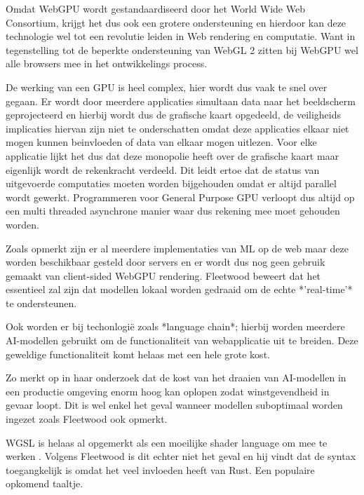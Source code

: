Omdat WebGPU wordt gestandaardiseerd door het World Wide Web Consortium, krijgt het dus ook een grotere ondersteuning en hierdoor kan deze technologie wel tot een revolutie leiden in Web rendering en computatie. Want in tegenstelling tot de beperkte ondersteuning van WebGL 2 zitten bij WebGPU wel alle browsers mee in het ontwikkelings process. \autocite{Surma2022}

\bigbreak{}

De werking van een GPU is heel complex, hier wordt dus vaak te snel over gegaan. Er wordt door meerdere applicaties simultaan data naar het beeldscherm geprojecteerd en hierbij wordt dus de grafische kaart opgedeeld, de veiligheids implicaties hiervan zijn niet te onderschatten omdat deze applicaties elkaar niet mogen kunnen beinvloeden of data van elkaar mogen uitlezen. Voor elke applicatie lijkt het dus dat deze monopolie heeft over de grafische kaart maar eigenlijk wordt de rekenkracht verdeeld. Dit leidt ertoe dat de status van uitgevoerde computaties moeten worden bijgehouden omdat er altijd parallel wordt gewerkt. Programmeren voor General Purpose GPU verloopt dus altijd op een multi threaded asynchrone manier waar dus rekening mee moet gehouden worden. \autocite{Surma2022}

Zoals \textcite{Fleetwood2023a} opmerkt zijn er al meerdere implementaties van ML op de web maar deze worden beschikbaar gesteld door servers en er wordt dus nog geen gebruik gemaakt van client-sided WebGPU rendering. Fleetwood beweert dat het essentieel zal zijn dat modellen lokaal worden gedraaid om de echte *'real-time'* te ondersteunen.

\bigbreak{}

Ook worden er bij techonlogië zoals *language chain*; hierbij worden meerdere AI-modellen gebruikt om de functionaliteit van webapplicatie uit te breiden. Deze geweldige functionaliteit komt helaas met een hele grote kost.

\bigbreak{}

Zo merkt \textcite{Huyen2023} op in haar onderzoek dat de kost van het draaien van AI-modellen in een productie omgeving enorm hoog kan oplopen zodat winstgevendheid in gevaar loopt. Dit is wel enkel het geval wanneer modellen suboptimaal worden ingezet zoals Fleetwood ook opmerkt.

\bigbreak{}

WGSL is helaas al opgemerkt als een moeilijke shader language om mee te werken \textcite{Madrigal2023}. Volgens Fleetwood is dit echter niet het geval en hij vindt dat de syntax toegangkelijk is omdat het veel invloeden heeft van Rust. Een populaire opkomend taaltje.

